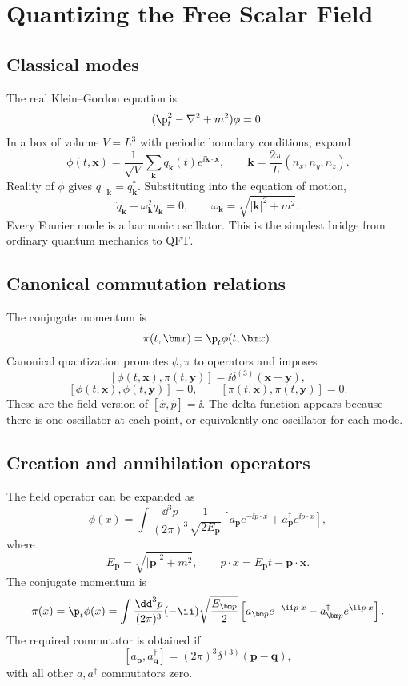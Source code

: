 \chapter{Quantizing the Free Scalar Field}

\section{Classical modes}

The real Klein--Gordon equation is
\[
  (\p_t^2-\nabla^2+m^2)\phi=0.
\]
In a box of volume \(V=L^3\) with periodic boundary conditions, expand
\[
  \phi(t,\bm x)=\frac1{\sqrt V}\sum_{\bm k}q_{\bm k}(t)e^{\ii\bm k\cdot\bm x},
  \qquad
  \bm k=\frac{2\pi}{L}(n_x,n_y,n_z).
\]
Reality of \(\phi\) gives \(q_{-\bm k}=q_{\bm k}^*\).  Substituting into the equation of motion,
\[
  \ddot q_{\bm k}+\omega_{\bm k}^2q_{\bm k}=0,
  \qquad
  \omega_{\bm k}=\sqrt{|\bm k|^2+m^2}.
\]
Every Fourier mode is a harmonic oscillator.  This is the simplest bridge from ordinary quantum mechanics to QFT.

\section{Canonical commutation relations}

The conjugate momentum is
\[
  \pi(t,\bm x)=\p_t\phi(t,\bm x).
\]
Canonical quantization promotes \(\phi,\pi\) to operators and imposes
\[
  [\phi(t,\bm x),\pi(t,\bm y)]=\ii\delta^{(3)}(\bm x-\bm y),
\]
\[
  [\phi(t,\bm x),\phi(t,\bm y)]=0,\qquad
  [\pi(t,\bm x),\pi(t,\bm y)]=0.
\]
These are the field version of \([\hat x,\hat p]=\ii\).  The delta function appears because there is one oscillator at each point, or equivalently one oscillator for each mode.

\section{Creation and annihilation operators}

The field operator can be expanded as
\[
  \phi(x)
  =
  \int\frac{\dd^3p}{(2\pi)^3}
  \frac{1}{\sqrt{2E_{\bm p}}}
  \left[
  a_{\bm p}e^{-\ii p\cdot x}
  +
  a_{\bm p}^\dagger e^{\ii p\cdot x}
  \right],
\]
where
\[
  E_{\bm p}=\sqrt{|\bm p|^2+m^2},
  \qquad
  p\cdot x=E_{\bm p}t-\bm p\cdot\bm x.
\]
The conjugate momentum is
\[
  \pi(x)=\p_t\phi(x)
  =
  \int\frac{\dd^3p}{(2\pi)^3}
  (-\ii)\sqrt{\frac{E_{\bm p}}{2}}
  \left[
  a_{\bm p}e^{-\ii p\cdot x}
  -
  a_{\bm p}^\dagger e^{\ii p\cdot x}
  \right].
\]
The required commutator is obtained if
\[
  [a_{\bm p},a_{\bm q}^\dagger]=(2\pi)^3\delta^{(3)}(\bm p-\bm q),
\]
with all other \(a,a^\dagger\) commutators zero.

